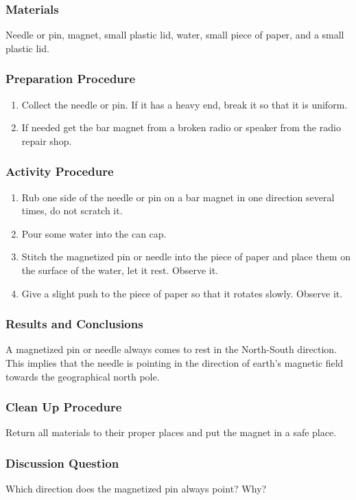 \subsubsection*{Materials}
Needle or pin, magnet, small plastic lid, water, small piece of paper, and a small plastic lid.

\subsubsection*{Preparation Procedure}
\begin{enumerate}
\item{Collect the needle or pin.  If it has a heavy end, break it so that it is uniform.} 
\item{If needed get the bar magnet from a broken radio or speaker from the radio repair shop.}
\end{enumerate}

\subsubsection*{Activity Procedure}
\begin{enumerate}
\item{Rub one side of the needle or pin on a bar magnet in one direction several times, do not scratch it.} 
\item{Pour some water into the can cap.} 
\item{Stitch the magnetized pin or needle into the piece of paper and place them on the surface of the water, let it rest. Observe it.} 
\item{Give a slight push to the piece of paper so that it rotates slowly. Observe it.} 
\end{enumerate}

\subsubsection*{Results and Conclusions}
A magnetized pin or needle always comes to rest in the North-South direction.  This implies that the needle is pointing in the direction of earth's magnetic field towards the geographical north pole.

\subsubsection*{Clean Up Procedure}
Return all materials to their proper places and put the magnet in a safe place.

\subsubsection*{Discussion Question}
Which direction does the magnetized pin always point? Why?

